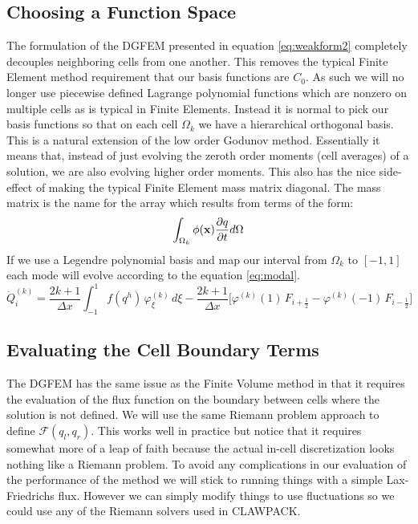 \documentclass[10]{amsart}
\begin{document}
 \subsection{Choosing a Function Space}
 The formulation of the DGFEM presented in equation \eqref{eq:weakform2} completely decouples neighboring cells from
 one another.
 This removes the typical Finite Element method requirement that our basis functions are $C_0$. As such we will no longer
 use piecewise defined Lagrange polynomial functions which are nonzero on multiple cells as is typical in Finite Elements. 
 Instead it is normal to pick our basis functions so that on each
 cell $\Omega_k$ we have a hierarchical orthogonal basis. This is a natural extension of the low order Godunov method.
 Essentially it means that, instead of just evolving the zeroth order moments (cell averages) of a solution, we are also
 evolving higher order moments. This also has the nice side-effect of making the typical Finite Element mass matrix  
 diagonal. The mass matrix is the name for the array which results from terms of the form:
 $$\int_{\Omega_k} \phi({\bf x}) \frac{\partial q}{\partial t} d\Omega $$
 If we use a Legendre polynomial basis and map our interval from $\Omega_k$ to $[-1,1]$ each
 mode will evolve according to the equation \ref{eq:modal}.
 	 \begin{equation}
 \dot{Q}^{(k)}_i = 
		\frac{2k +1}{\Delta x} \int_{-1}^{1} f \left( q^h \right) \, \varphi^{(k)}_{\xi}
			 \, d\xi
			 - \frac{2k +1}{\Delta x} \biggl[
	 	\varphi^{(k)}(1) \, F_{i+\frac{1}{2}} - \varphi^{(k)}(-1) \, F_{i-\frac{1}{2}} \biggr]
	 	\label{eq:modal}
 	 \end{equation}

 \subsection{Evaluating the Cell Boundary Terms}
 The DGFEM has the same issue as the Finite Volume method in that it requires the evaluation of the flux function
 on the boundary between cells where the solution is not defined. 
 We will use the same Riemann problem approach to define $\mathcal{F}(q_l,q_r)$.
 This works well in practice but notice that it requires somewhat
 more of a leap of faith because the actual in-cell discretization looks nothing like a Riemann problem.
 To avoid any complications in our evaluation of the performance of the method we will stick to running things with
 a simple Lax-Friedrichs flux. However we can simply modify things to use fluctuations so we could use any of the Riemann
 solvers used in CLAWPACK.
\end{document}
